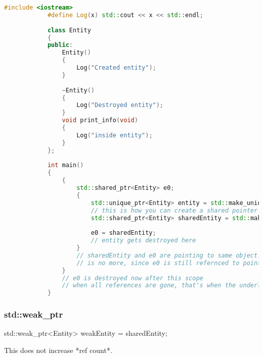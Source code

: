 \documentclass{article}
\begin{document}
        \begin{lstlisting}[language=C++, caption=std::shared\_ptr example]
            #include <iostream>
            #define Log(x) std::cout << x << std::endl;
            
            class Entity
            {
            public:
            	Entity()
            	{
            		Log("Created entity");
            	}
            
            	~Entity()
            	{
            		Log("Destroyed entity");
            	}
            	void print_info(void)
            	{
            		Log("inside entity");
            	}
            };
            
            int main()
            {
            	{
            		std::shared_ptr<Entity> e0;
            		{
            			std::unique_ptr<Entity> entity = std::make_unique<Entity>();
            			// this is how you can create a shared pointer
            			std::shared_ptr<Entity> sharedEntity = std::make_shared<Entity>();
            
            			e0 = sharedEntity;
            			// entity gets destroyed here
            		}
            		// sharedEntity and e0 are pointing to same object. so, even though sharedEntity 
            		// is no more, since e0 is still refernced to pointer, the destroyer isn't called.	
            	}
            	// e0 is destroyed now after this scope
            	// when all references are gone, that's when the underlying object is destroyed
            }
        \end{lstlisting}
        
        \subsubsection{std::weak\_ptr}
        std::weak\_ptr<Entity> weakEntity = sharedEntity;
        
        This does not increase *ref count*. 
        
\end{document}

